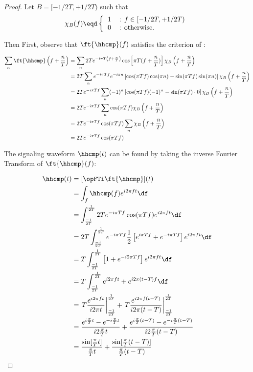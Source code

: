 \begin{proof}
Let $B=[-1/2T, +1/2T)$ such that
\[
\chi_B(f) \eqd
\left\{
\begin{tabular}{llll}
   1 & : $f\in [-1/2T, +1/2T)$ \\
   0 & : otherwise.
\end{tabular}
\right.
\]

Then
First, observe that $\ft{\hhcmp}(f)$ satisfies
the criterion of :

\begin{align*}
   \sum_n \ft{\hhcmp}\left( f + \frac{n}{T} \right)
     &= \sum_n 2T e^{-i\pi T\left(f+\frac{n}{T}\right)}
        \cos\left[\pi T(f+\frac{n}{T})\right]
        \chi_B\left(f+\frac{n}{T}\right)
   \\&= 2T \sum_n
        e^{-i\pi Tf}
        e^{-i\pi n }
        \left[\cos(\pi Tf)\cos(\pi n)-\sin(\pi Tf)\sin(\pi n) \right]
        \chi_B\left(f+\frac{n}{T}\right)
   \\&= 2T e^{-i\pi Tf} \sum_n
        (-1)^n
        \left[\cos(\pi Tf)(-1)^n -\sin(\pi Tf)\cdot0 \right]
        \chi_B\left(f+\frac{n}{T}\right)
   \\&= 2T e^{-i\pi Tf} \sum_n
        \cos(\pi Tf)
        \chi_B\left(f+\frac{n}{T}\right)
   \\&= 2T e^{-i\pi Tf} \cos(\pi Tf) \sum_n
        \chi_B\left(f+\frac{n}{T}\right)
   \\&= 2T e^{-i\pi Tf} \cos(\pi Tf)
\end{align*}

The signaling waveform $\hhcmp(t)$ can be found by taking
the inverse Fourier Transform of $\ft{\hhcmp}(f)$:

\begin{align*}
   \hhcmp(t)
     &= [\opFTi\ft{\hhcmp}](t)
   \\&= \int_f \hhcmp(f) e^{i2\pi ft} \df
   \\&= \int_\frac{-1}{2T}^\frac{1}{2T}
        2T e^{-i\pi Tf} \cos(\pi Tf) e^{i2\pi ft} \df
   \\&= 2T\int_\frac{-1}{2T}^\frac{1}{2T}
        e^{-i\pi Tf}
        \frac{1}{2}\left[ e^{i\pi Tf} + e^{-i\pi Tf}  \right]
        e^{i2\pi ft} \df
   \\&= T\int_\frac{-1}{2T}^\frac{1}{2T}
        \left[ 1 + e^{-i2\pi Tf}  \right]
        e^{i2\pi ft} \df
   \\&= T\int_\frac{-1}{2T}^\frac{1}{2T}
        e^{i2\pi ft} + e^{i2\pi(t-T)f} \df
   \\&= \left. T\frac{e^{i2\pi ft    }}{i2\pi t    } \right|_\frac{-1}{2T}^\frac{1}{2T}  +
        \left. T\frac{e^{i2\pi f(t-T)}}{i2\pi (t-T)} \right|_\frac{-1}{2T}^\frac{1}{2T}
   \\&= \frac{e^{i\frac{\pi}{T}t    }-e^{-i\frac{\pi}{T}t    }}{i2\frac{\pi}{T} t    }   +
        \frac{e^{i\frac{\pi}{T}(t-T)}-e^{-i\frac{\pi}{T}(t-T)}}{i2\frac{\pi}{T} (t-T)}
   \\&= \frac{\sin[\frac{\pi}{T}t]    }{\frac{\pi}{T} t    }   +
        \frac{\sin[\frac{\pi}{T}(t-T)]}{\frac{\pi}{T} (t-T)}
\end{align*}
\end{proof}

